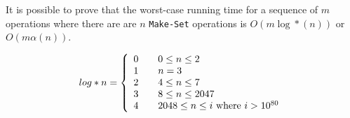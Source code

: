 \noindent It is possible to prove that the worst-case running time for a sequence of $m$ operations where there are are $n$ \texttt{Make-Set} operations is $O(m \log*(n))$ or $O(m \alpha(n))$.

$$ log* n = \left \{ \begin{array}{l l}
	0 & \quad 0 \leq n \leq 2 \\
	1 & \quad n=3 \\
	2 & \quad 4 \leq n \leq 7 \\
	3 & \quad 8 \leq n \leq 2047 \\
	4 & \quad 2048 \leq n \leq i \textrm{ where } i > 10^{80} \\
\end{array} \right . $$


